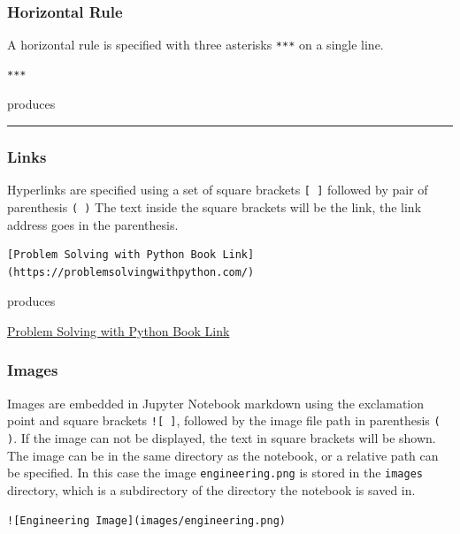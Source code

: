 \documentclass{book}
\begin{document}
\subsubsection{Horizontal Rule}\label{horizontal-rule}

A horizontal rule is specified with three asterisks \lstinline!***! on a
single line.

\begin{lstlisting}
***
\end{lstlisting}

produces

\begin{center}\rule{0.5\linewidth}{\linethickness}\end{center}

\subsubsection{Links}\label{links}

Hyperlinks are specified using a set of square brackets \lstinline![ ]!
followed by pair of parenthesis \lstinline!( )! The text inside the
square brackets will be the link, the link address goes in the
parenthesis.

\begin{lstlisting}
[Problem Solving with Python Book Link](https://problemsolvingwithpython.com/)
\end{lstlisting}

produces

\href{https://problemsolvingwithpython.com/}{Problem Solving with Python
Book Link}

\subsubsection{Images}\label{images}

Images are embedded in Jupyter Notebook markdown using the exclamation
point and square brackets \lstinline"![ ]", followed by the image file
path in parenthesis \lstinline!( )!. If the image can not be displayed,
the text in square brackets will be shown. The image can be in the same
directory as the notebook, or a relative path can be specified. In this
case the image \lstinline!engineering.png! is stored in the
\lstinline!images! directory, which is a subdirectory of the directory
the notebook is saved in.

\begin{lstlisting}
![Engineering Image](images/engineering.png)
\end{lstlisting}
\end{document}
